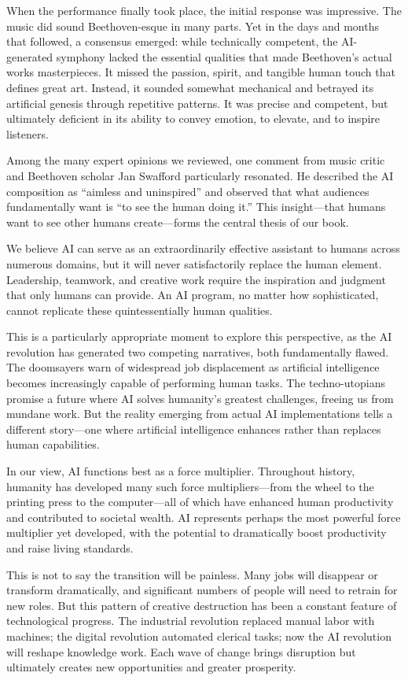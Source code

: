 \documentclass[
  Letterpaper,
]{scrbook}
\begin{document}
When the performance finally took place, the initial response was
impressive. The music did sound Beethoven-esque in many parts. Yet in
the days and months that followed, a consensus emerged: while
technically competent, the AI-generated symphony lacked the essential
qualities that made Beethoven's actual works masterpieces. It missed the
passion, spirit, and tangible human touch that defines great art.
Instead, it sounded somewhat mechanical and betrayed its artificial
genesis through repetitive patterns. It was precise and competent, but
ultimately deficient in its ability to convey emotion, to elevate, and
to inspire listeners.

Among the many expert opinions we reviewed, one comment from music
critic and Beethoven scholar Jan Swafford particularly resonated. He
described the AI composition as ``aimless and uninspired'' and observed
that what audiences fundamentally want is ``to see the human doing it.''
This insight---that humans want to see other humans create---forms the
central thesis of our book.

We believe AI can serve as an extraordinarily effective assistant to
humans across numerous domains, but it will never satisfactorily replace
the human element. Leadership, teamwork, and creative work require the
inspiration and judgment that only humans can provide. An AI program, no
matter how sophisticated, cannot replicate these quintessentially human
qualities.

This is a particularly appropriate moment to explore this perspective,
as the AI revolution has generated two competing narratives, both
fundamentally flawed. The doomsayers warn of widespread job displacement
as artificial intelligence becomes increasingly capable of performing
human tasks. The techno-utopians promise a future where AI solves
humanity's greatest challenges, freeing us from mundane work. But the
reality emerging from actual AI implementations tells a different
story---one where artificial intelligence enhances rather than replaces
human capabilities.

In our view, AI functions best as a force multiplier. Throughout
history, humanity has developed many such force multipliers---from the
wheel to the printing press to the computer---all of which have enhanced
human productivity and contributed to societal wealth. AI represents
perhaps the most powerful force multiplier yet developed, with the
potential to dramatically boost productivity and raise living standards.

This is not to say the transition will be painless. Many jobs will
disappear or transform dramatically, and significant numbers of people
will need to retrain for new roles. But this pattern of creative
destruction has been a constant feature of technological progress. The
industrial revolution replaced manual labor with machines; the digital
revolution automated clerical tasks; now the AI revolution will reshape
knowledge work. Each wave of change brings disruption but ultimately
creates new opportunities and greater prosperity.
\end{document}
